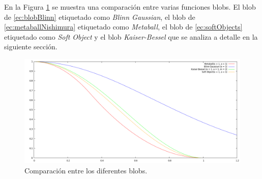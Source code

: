 En la Figura \ref{fig:comBlobs} se muestra una comparación entre varias funciones blobs. El blob de \eqref{ec:blobBlinn} etiquetado como \emph{Blinn Gaussian}, el blob de \eqref{ec:metaballNishimura} etiquetado como \emph{Metaball}, el blob de \eqref{ec:softObjects} etiquetado como \emph{Soft Object} y el blob \emph{Kaiser-Bessel} que se analiza a detalle en la siguiente sección.

\begin{figure}[htp]
 \centering
  \includegraphics[scale=0.3]{img/cap02/comparision}
  \caption[Comparación entre las diferentes funciones blobs]{Comparación entre los diferentes blobs.}
  \label{fig:comBlobs}
\end{figure}



